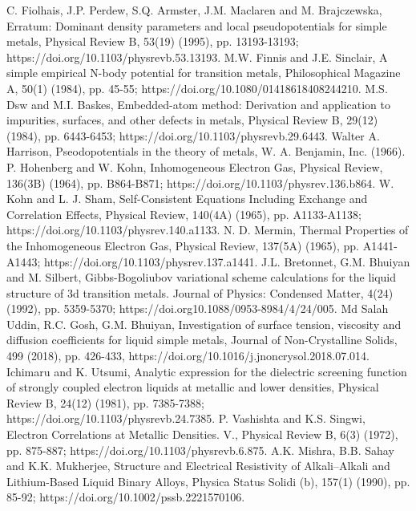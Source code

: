\documentclass[final,12pt]{elsarticle}
\begin{document}
{\begin{thebibliography}{thesis}
	C. Fiolhais, J.P. Perdew, S.Q. Armster, J.M. Maclaren and M. Brajczewska, Erratum: Dominant density parameters and local pseudopotentials for simple metals, Physical Review B, 53(19) (1995), pp. 13193-13193; https://doi.org/10.1103/physrevb.53.13193.
	M.W. Finnis and J.E. Sinclair, A simple empirical N-body potential for transition metals, Philosophical Magazine A, 50(1) (1984), pp. 45-55; https://doi.org/10.1080/01418618408244210.
	M.S. Dsw and M.I. Baskes, Embedded-atom method: Derivation and application to impurities, surfaces, and other defects in metals, Physical Review B, 29(12) (1984), pp. 6443-6453; https://doi.org/10.1103/physrevb.29.6443.
	Walter A. Harrison, Pseodopotentials in the theory of metals, W. A. Benjamin, Inc. (1966).
	P. Hohenberg and W. Kohn, Inhomogeneous Electron Gas, Physical Review, 136(3B) (1964), pp. B864-B871; https://doi.org/10.1103/physrev.136.b864.
	W. Kohn and L. J. Sham, Self-Consistent Equations Including Exchange and Correlation Effects, Physical Review, 140(4A) (1965), pp. A1133-A1138; https://doi.org/10.1103/physrev.140.a1133.
	N. D. Mermin, Thermal Properties of the Inhomogeneous Electron Gas, Physical Review, 137(5A) (1965), pp. A1441-A1443; https://doi.org/10.1103/physrev.137.a1441.
	J.L. Bretonnet, G.M. Bhuiyan and M. Silbert, Gibbs-Bogoliubov variational scheme calculations for the liquid structure of 3d transition metals. Journal of Physics: Condensed Matter, 4(24) (1992), pp. 5359-5370; https://doi.org10.1088/0953-8984/4/24/005.
	Md Salah Uddin, R.C. Gosh, G.M. Bhuiyan, Investigation of surface tension, viscosity and diffusion coefficients for liquid simple metals, Journal of Non-Crystalline Solids, 499 (2018), pp. 426-433, https://doi.org/10.1016/j.jnoncrysol.2018.07.014.
	Ichimaru and K. Utsumi, Analytic expression for the dielectric screening function of strongly coupled electron liquids at metallic and lower densities, Physical Review B, 24(12) (1981), pp.  7385-7388; https://doi.org/10.1103/physrevb.24.7385.
	P. Vashishta and K.S. Singwi, Electron Correlations at Metallic Densities. V., Physical Review B, 6(3) (1972), pp. 875-887; https://doi.org/10.1103/physrevb.6.875.
	A.K. Mishra, B.B. Sahay and K.K. Mukherjee, Structure and Electrical Resistivity of Alkali–Alkali and Lithium-Based Liquid Binary Alloys, Physica Status Solidi (b), 157(1) (1990), pp. 85-92; https://doi.org/10.1002/pssb.2221570106.

\end{thebibliography}}
\end{document}
